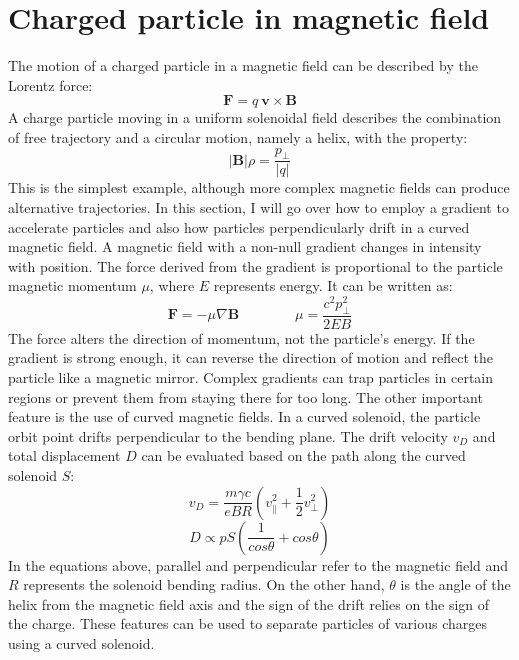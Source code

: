 \chapter{Charged particle in magnetic field}\label{appendix1}
The motion of a charged particle in a magnetic field can be described by the Lorentz force:
\begin{equation}
    \mathbf{F}=q \ \mathbf{v}\times\mathbf{B}
\end{equation}
A charge particle moving in a uniform solenoidal field describes the combination of free trajectory and a circular motion, namely a helix, with the property:
\begin{equation}\label{partincamp}
    |\mathbf{B}|\rho=\frac{p_\perp}{|q|}
\end{equation}
This is the simplest example, although more complex magnetic fields can produce alternative trajectories. In this section, I will go over how to employ a gradient to accelerate particles and also how particles perpendicularly drift in a curved magnetic field. A magnetic field with a non-null gradient changes in intensity with position. The force derived from the gradient is proportional to the particle magnetic momentum $\mu$, where $E$ represents energy. It can be written as:
\begin{equation}
   \mathbf{F}=-\mu \nabla \mathbf{B} \qquad \qquad \mu=\frac{c^2 p_\perp^2}{2 E B}
\end{equation}
The force alters the direction of momentum, not the particle's energy. If the gradient is strong enough, it can reverse the direction of motion and reflect the particle like a magnetic mirror. Complex gradients can trap particles in certain regions or prevent them from staying there for too long.
The other important feature is the use of curved magnetic fields. In a curved solenoid, the particle orbit point drifts perpendicular to the bending plane. The drift velocity $v_D$ and total displacement $D$ can be evaluated based on the path along the curved solenoid $S$:
\begin{equation}
    v_D=\frac{m \gamma c}{e B R}(v_\parallel ^2+\frac{1}{2}v_\perp ^2)
\end{equation}
\begin{equation}
    D \propto p S (\frac{1}{cos \theta} + cos \theta)
\end{equation}
In the equations above, parallel and perpendicular refer to the magnetic field and $R$ represents the solenoid bending radius. On the other hand, $\theta$ is the angle of the helix from the magnetic field axis and the sign of the drift relies on the sign of the charge. These features can be used to separate particles of various charges using a curved solenoid.
